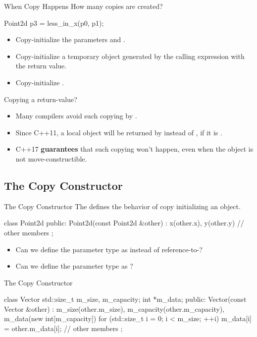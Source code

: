 \documentclass{beamer}
\begin{document}
\begin{frame}[fragile]{When Copy Happens}
    How many copies are created?
    \begin{cpp}
Point2d p3 = less_in_x(p0, p1);
    \end{cpp}
    \pause
    \begin{itemize}
        \item Copy-initialize the parameters  and .
        \item Copy-initialize a temporary object generated by the calling expression with the return value. 
        \item Copy-initialize . 
    \end{itemize}
    \pause
    Copying a return-value?
    \begin{itemize}
        \item Many compilers avoid such copying by .
        \item Since C++11, a local object will be returned by  instead of , if it is .
        \item C++17 \textbf{guarantees} that such copying won't happen, even when the object is not move-constructible.
    \end{itemize}
\end{frame}

\subsection{The Copy Constructor}

\begin{frame}[fragile]{The Copy Constructor}
    The  defines the behavior of copy initializing an object.
    \begin{cpp}
class Point2d {
 public:
  Point2d(const Point2d &other)
    : x(other.x), y(other.y) {}
  // other members
};
    \end{cpp}
    \pause
    \begin{itemize}
        \item Can we define the parameter type as  instead of reference-to-?
        \item Can we define the parameter type as ?
    \end{itemize}
\end{frame}

\begin{frame}[fragile]{The Copy Constructor}
    \begin{cpp}
class Vector {
  std::size_t m_size, m_capacity;
  int *m_data;
 public:
  Vector(const Vector &other)
    : m_size(other.m_size),
      m_capacity(other.m_capacity),
      m_data(new int[m_capacity]{}) {
    for (std::size_t i = 0; i < m_size; ++i)
      m_data[i] = other.m_data[i];
  }
  // other members
};
    \end{cpp}
\end{frame}
\end{document}
